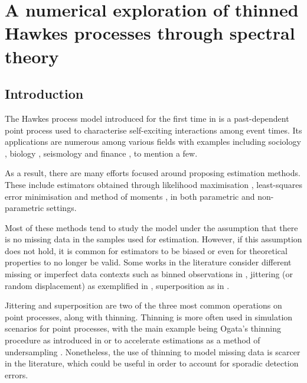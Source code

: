 
\chapter[][]{A numerical exploration of thinned Hawkes processes through spectral theory}\label{chapter:spectral_thinning}

\section{Introduction}

The Hawkes process model introduced for the first time in \textcite{Hawkes1971} is a past-dependent point process used to characterise self-exciting interactions among event times. 
Its applications are numerous among various fields with examples including sociology \parencite{Linderman2014},
biology \parencite{Gupta2018, Lambert2018, Rizoiu2018},
seismology \parencite{Ogata1988, Ogata1998}
and finance \parencite{Bacry2013, Bacry2015, Hawkes2018}, to mention a few.

As a result, there are many efforts focused around proposing estimation methods. These include estimators obtained through likelihood maximisation \parencite{Ogata1978, Ozaki1979}, least-squares error minimisation \parencite{Reynaud2014,Bacry2020} and method of moments \parencite{DaFonseca2013}, in both parametric and non-parametric settings.

Most of these methods tend to study the model under the assumption that there is no missing data in the samples used for estimation. 
However, if this assumption does not hold, it is common for estimators to be biased or even for theoretical properties to no longer be valid.
Some works in the literature consider different missing or imperfect data contexts such as binned observations in \textcite{Cheysson2022}, jittering (or random displacement) as exemplified in \textcite{Antoniadis2006,Bonnet2022}, superposition as in \textcite{Bonnet2024}. 

Jittering and superposition are two of the three most common operations on point processes, along with thinning.
Thinning is more often used in simulation scenarios for point processes, 
with the main example being Ogata's thinning procedure as introduced in \textcite{Ogata1981} or to accelerate estimations as a method of undersampling \parencite{Li2019}.
Nonetheless, the use of thinning to model missing data is scarcer in the literature, 
which could be useful in order to account for sporadic detection errors.

